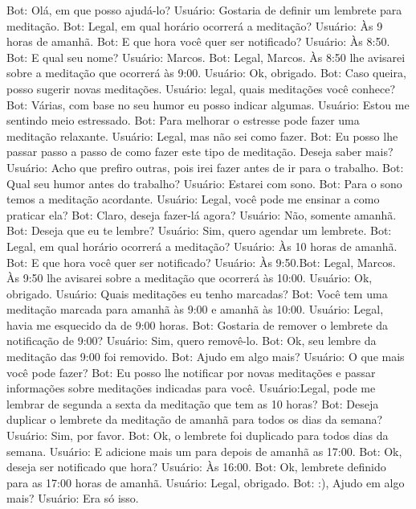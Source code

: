 Bot: Olá, em que posso ajudá-lo?
Usuário: Gostaria de definir um lembrete para meditação.
Bot: Legal, em qual horário ocorrerá a meditação?
Usuário: Às 9 horas de amanhã.
Bot: E que hora você quer ser notificado?
Usuário: Às 8:50.
Bot: E qual seu nome?
Usuário: Marcos.
Bot: Legal, Marcos. Às 8:50 lhe avisarei sobre a meditação que ocorrerá às 9:00.
Usuário: Ok, obrigado.
Bot: Caso queira, posso sugerir novas meditações.
Usuário: legal, quais meditações você conhece?
Bot: Várias, com base no seu humor eu posso indicar algumas.
Usuário: Estou me sentindo meio estressado.
Bot: Para melhorar o estresse pode fazer uma meditação relaxante.
Usuário: Legal, mas não sei como fazer.
Bot: Eu posso lhe passar passo a passo de como fazer este tipo de meditação. Deseja
saber mais?
Usuário: Acho que prefiro outras, pois irei fazer antes de ir para o trabalho.
Bot: Qual seu humor antes do trabalho?
Usuário: Estarei com sono.
Bot: Para o sono temos a meditação acordante.
Usuário: Legal, você pode me ensinar a como praticar ela?
Bot: Claro, deseja fazer-lá agora?
Usuário: Não, somente amanhã.
Bot: Deseja que eu te lembre?
Usuário: Sim, quero agendar um lembrete.
Bot: Legal, em qual horário ocorrerá a meditação?
Usuário: Às 10 horas de amanhã.
Bot: E que hora você quer ser notificado?
Usuário: Às 9:50.Bot: Legal, Marcos. Às 9:50 lhe avisarei sobre a meditação que ocorrerá às 10:00.
Usuário: Ok, obrigado.
Usuário: Quais meditações eu tenho marcadas?
Bot: Você tem uma meditação marcada para amanhã às 9:00 e amanhã às 10:00.
Usuário: Legal, havia me esquecido da de 9:00 horas.
Bot: Gostaria de remover o lembrete da notificação de 9:00?
Usuário: Sim, quero removê-lo.
Bot: Ok, seu lembre da meditação das 9:00 foi removido.
Bot: Ajudo em algo mais?
Usuário: O que mais você pode fazer?
Bot: Eu posso lhe notificar por novas meditações e passar informações sobre meditações
indicadas para você.
Usuário:Legal, pode me lembrar de segunda a sexta da meditação que tem as 10 horas?
Bot: Deseja duplicar o lembrete da meditação de amanhã para todos os dias da semana?
Usuário: Sim, por favor.
Bot: Ok, o lembrete foi duplicado para todos dias da semana.
Usuário: E adicione mais um para depois de amanhã as 17:00.
Bot: Ok, deseja ser notificado que hora?
Usuário: Às 16:00.
Bot: Ok, lembrete definido para as 17:00 horas de amanhã.
Usuário: Legal, obrigado.
Bot: :), Ajudo em algo mais?
Usuário: Era só isso.